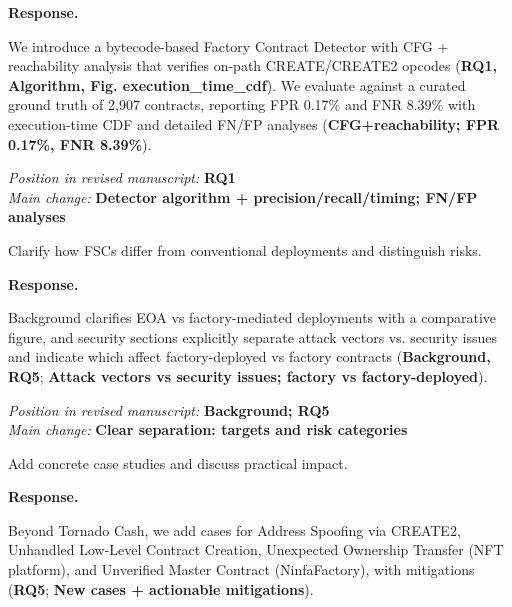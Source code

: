 \documentclass[acmsmall]{acmart}
\begin{document}
	\noindent
	\textbf{Response.}

	We introduce a bytecode-based Factory Contract Detector with CFG + reachability analysis that
	verifies on-path CREATE/CREATE2 opcodes ({\textbf{RQ1, Algorithm, Fig. execution\_time\_cdf}}). We
	evaluate against a curated ground truth of 2,907 contracts, reporting FPR 0.17\% and FNR 8.39\%
	with execution-time CDF and detailed FN/FP analyses ({\textbf{CFG+reachability; FPR 0.17\%, FNR 8.39\%}}).

	\vspace{0.25em}
	\noindent
	\textit{Position in revised manuscript:} {\color{red}\textbf{RQ1}}\\ \textit{Main change:} {\color{blue}\textbf{Detector algorithm + precision/recall/timing; FN/FP analyses}}

	\begin{tcolorbox}
		[commentbox,title=Editor/AE -- Comment 3] Clarify how FSCs differ from conventional
		deployments and distinguish risks.
	\end{tcolorbox}

	\noindent
	\textbf{Response.}

	Background clarifies EOA vs factory-mediated deployments with a comparative figure, and security
	sections explicitly separate attack vectors vs. security issues and indicate which affect factory-deployed
	vs factory contracts ({\textbf{Background, RQ5}}; {\textbf{Attack vectors vs security issues; factory vs factory-deployed}}).

	\vspace{0.25em}
	\noindent
	\textit{Position in revised manuscript:} {\color{red}\textbf{Background; RQ5}}\\ \textit{Main
	change:} {\color{blue}\textbf{Clear separation: targets and risk categories}}

	\begin{tcolorbox}
		[commentbox,title=Editor/AE -- Comment 4] Add concrete case studies and discuss practical
		impact.
	\end{tcolorbox}

	\noindent
	\textbf{Response.}

	Beyond Tornado Cash, we add cases for Address Spoofing via CREATE2, Unhandled Low-Level Contract
	Creation, Unexpected Ownership Transfer (NFT platform), and Unverified Master Contract (NinfaFactory),
	with mitigations ({\textbf{RQ5}}; {\textbf{New cases + actionable mitigations}}).
\end{document}
